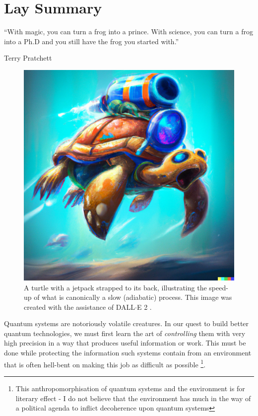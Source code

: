 \chapter{Lay Summary}
\epigraph{“With magic, you can turn a frog into a prince. With science, you can turn a frog into a Ph.D and you still have the frog you started with.”}{Terry Pratchett}

\begin{figure}
\centering
\includegraphics[width=0.9\linewidth]{images/COLD_turle.png} \caption[DALL$\cdot$E turtle illustration.]{A turtle with a jetpack strapped to its back, illustrating the speed-up of what is canonically a slow (adiabatic) process. This image was created with the assistance of DALL$\cdot$E 2 \cite{noauthor_dalle_nodate}.}\label{fig:COLD_TURTLE}
\vspace{-5pt}
\end{figure}

Quantum systems are notoriously volatile creatures. In our quest to build better quantum technologies, we must first learn the art of \emph{controlling} them with very high precision in a way that produces useful information or work. This must be done while protecting the information such systems contain from an environment that is often hell-bent on making this job as difficult as possible \footnote{This anthropomorphisation of quantum systems and the environment is for literary effect - I do not believe that the environment has much in the way of a political agenda to inflict decoherence upon quantum systems}.

